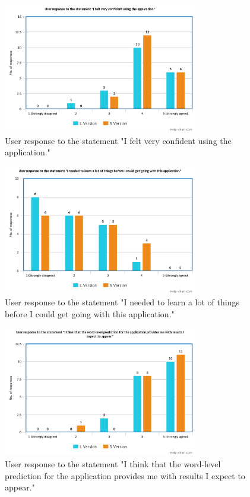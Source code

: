 \documentclass[journal]{./IEEE/IEEEtran}
\begin{document}
\begin{figure}[!ht]
\begin{center}

\includegraphics[width=85mm]{images/s9.png}
\caption{User response to the statement "I felt very confident using the application."}

\end{center}
\end{figure}

\begin{figure}[!ht]
\begin{center}

\includegraphics[width=85mm]{images/s10.png}
\caption{User response to the statement "I needed to learn a lot of things before I could get going with this application."}

\end{center}
\end{figure}

\begin{figure}[!ht]
\begin{center}

\includegraphics[width=85mm]{images/s11.png}
\caption{User response to the statement "I think that the word-level prediction for the application provides me with results I expect to appear."}

\end{center}
\end{figure}
\end{document}
